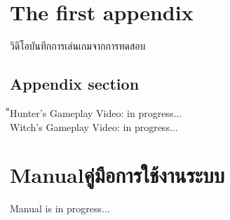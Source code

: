 \chapter{The first appendix}

วิดีโอบันทึกการเล่นเกมจากการทดสอบ

\section{Appendix section}

็Hunter's Gameplay Video: in progress... \\
Witch's Gameplay Video: in progress...

\chapter{\ifenglish Manual\else คู่มือการใช้งานระบบ\fi}

Manual is in progress...
